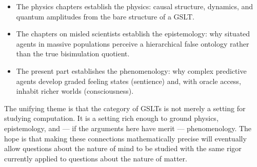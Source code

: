 \begin{itemize}[itemsep=4pt]
  \item The physics chapters establish the
        physics: causal structure, dynamics, and quantum amplitudes
        from the bare structure of a GSLT.

  \item The chapters on misled scientists establish the epistemology:
        why situated agents in massive populations perceive a
        hierarchical false ontology rather than the true bisimulation
        quotient.

  \item The present part establishes the phenomenology:
        why complex predictive agents develop graded feeling states
        (sentience) and, with oracle access, inhabit richer worlds
        (consciousness).
\end{itemize}

The unifying theme is that the category of GSLTs is not merely
a setting for studying computation.
It is a setting rich enough to ground physics, epistemology, and
--- if the arguments here have merit --- phenomenology.
The hope is that making these connections mathematically precise
will eventually allow questions about the nature of mind to be
studied with the same rigor currently applied to questions about
the nature of matter.

